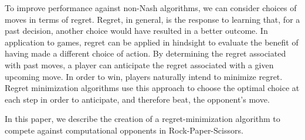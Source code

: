 To improve performance against non-Nash algorithms, we can consider choices of moves in terms of regret.  Regret, in general, is the response to learning that, for a past decision, another choice would have resulted in a better outcome.  In application to games, regret can be applied in hindsight to evaluate the benefit of having made a different choice of action.  By determining the regret associated with past moves, a player can anticipate the regret associated with a given upcoming move.  In order to win, players naturally intend to minimize regret.  Regret minimization algorithms use this approach to choose the optimal choice at each step in order to anticipate, and therefore beat, the opponent's move.

In this paper, we describe the creation of a regret-minimization algorithm to compete against computational opponents in Rock-Paper-Scissors.




